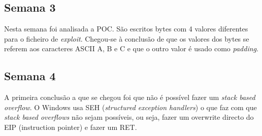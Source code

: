 \documentclass[11pt,a4paper]{article}
\begin{document}
\subsection{Semana 3}



Nesta semana foi analisada a POC. São escritos bytes com 4 valores diferentes para o ficheiro de \textit{exploit}. Chegou-se à conclusão de que os valores dos bytes se referem aos caracteres ASCII A, B e C e que o outro valor é usado como \textit{padding}.

\subsection{Semana 4}

A primeira conclusão a que se chegou foi que não é possível fazer um \textit{stack based overflow}. O Windows usa SEH (\textit{structured exception handlers}) o que faz com que \textit{stack based overflows} não sejam possíveis, ou seja, fazer um overwrite directo do EIP (instruction pointer) e fazer um RET.
\end{document}
